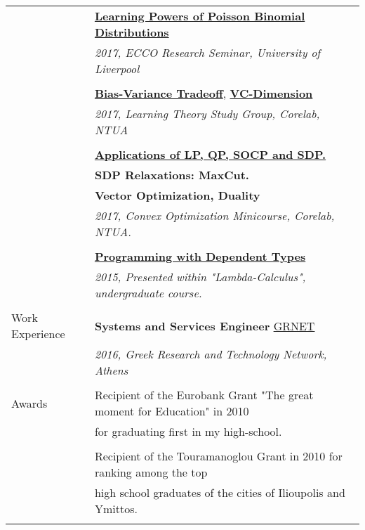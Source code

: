 \documentclass[letterpaper,11pt,oneside]{article}
\begin{document}
\begin{longtable}{@{} l l}
 &\href{https://vkonton.github.io/assets/talks/pbdPowers.pdf}
 {\textbf{Learning Powers of Poisson Binomial Distributions}}\\
 &\emph{2017, ECCO Research Seminar, University of Liverpool} \\
&\\

  &\href{https://vkonton.github.io/assets/talks/learning1.pdf}{\textbf{Bias-Variance Tradeoff}},
  \href{https://vkonton.github.io/assets/talks/learning2.pdf}{\textbf{VC-Dimension}}\\
  &\emph{2017, Learning Theory Study Group, Corelab, NTUA}\\
  &\\

  &\href{https://vkonton.github.io/talks/}{\textbf{Applications of LP, QP, SOCP and SDP.}}\\
  &\textbf{SDP Relaxations: MaxCut.}\\
  &\textbf{Vector Optimization, Duality} \\
  &\emph{2017, Convex Optimization Minicourse, Corelab, NTUA.}\\
  &\\

  &\href{https://vkonton.github.io/assets/talks/dependent.pdf}{\textbf{Programming with Dependent Types}} \\
  &\emph{2015, Presented within "Lambda-Calculus", undergraduate course.} \\
  &\\

\Large{Work Experience}
  &\textbf{Systems and Services Engineer} \href{https://grnet.gr/}{GRNET}\\
  & \emph{2016, Greek Research and Technology Network, Athens}\\
  &\\

 \Large{Awards}

 & Recipient of the Eurobank Grant "The great moment for Education" in 2010\\
 & for graduating first in my high-school. \\
 &\\

 & Recipient of the Touramanoglou Grant in 2010 for ranking among the top \\
 & high school graduates of the cities of Ilioupolis and Ymittos. \\
 &\\


\end{longtable}
\end{document}
